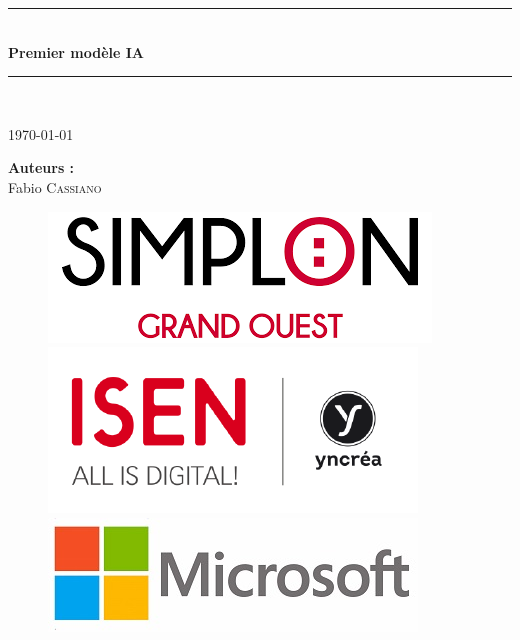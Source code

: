 \documentclass[french]{article}
\begin{document}
\begin{titlepage}

\newcommand{\HRule}{\rule{\linewidth}{0.5mm}} %

\center %
 
\HRule \\[0.4cm]
\vspace{1cm}
{ \huge \bfseries Premier modèle IA}\\ %
\vspace{1cm}
\HRule \\[1cm]
 
\vspace{1cm}

\Large \today

\vspace{3cm}

\begin{minipage}{0.4\textwidth}
\begin{center}
\Large \textbf{Auteurs :}\\
\vspace{0.5cm}
Fabio \textsc{Cassiano}
\end{center}
\end{minipage}

\vspace{5cm}

\begin{figure}[!ht]
	\includegraphics[height=0.1\columnwidth]{images/logo/logo_simplon.png}
	\hspace*{0.5cm}
	\includegraphics[height=0.12\columnwidth]{images/logo/logo_Isen.png}
	\hspace*{0.5cm}
	\includegraphics[height=0.1\columnwidth]{images/logo/logo_microsoft.jpg}
\end{figure}

\vfill

\end{titlepage}
\end{document}
